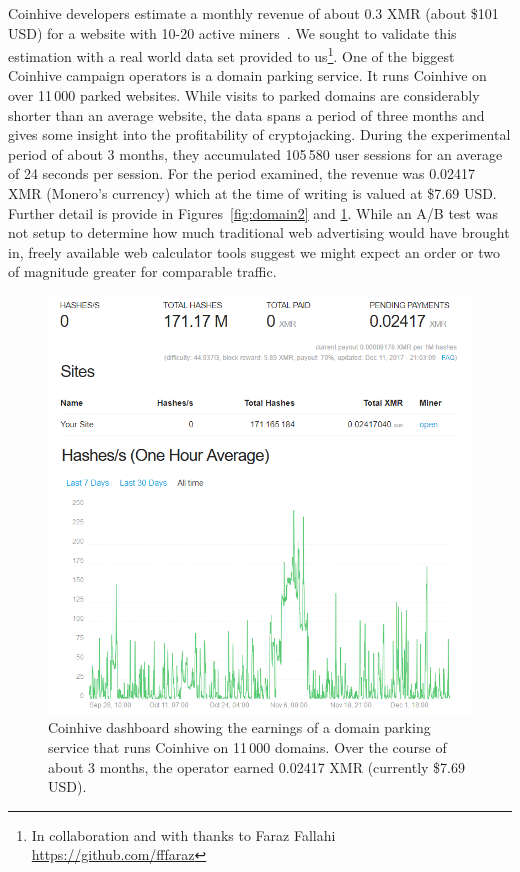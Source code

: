 Coinhive developers estimate a monthly revenue of about 0.3 XMR (about \$101 USD) for a website with 10-20 active miners~\cite{coinhive}. We sought to validate this estimation with a real world data set provided to us\footnote{In collaboration and with thanks to Faraz Fallahi \url{https://github.com/fffaraz}}. One of the biggest Coinhive campaign operators is a domain parking service. It runs Coinhive on over 11\,000 parked websites. While visits to parked domains are considerably shorter than an average website, the data spans a period of three months and gives some insight into the profitability of cryptojacking. During the experimental period of about 3 months, they accumulated 105\,580 user sessions for an average of 24 seconds per session. For the period examined, the revenue was 0.02417 XMR (Monero's currency) which at the time of writing is valued at \$7.69 USD. Further detail is provide in Figures~\ref{fig:domain2} and \ref{fig:domain1}. While an A/B test was not setup to determine how much traditional web advertising would have brought in, freely available web calculator tools suggest we might expect an order or two of magnitude greater for comparable traffic. 

\begin{figure}[h]
\centering
\includegraphics[width=0.8\linewidth]{figures/experiment_coinhive_results.png}
\caption[Coinhive earnings dashboard]{Coinhive dashboard showing the earnings of a domain parking service that runs Coinhive on 11\,000 domains. Over the course of about 3 months, the operator earned 0.02417 XMR (currently \$7.69 USD).}\label{fig:domain1}
\end{figure}


